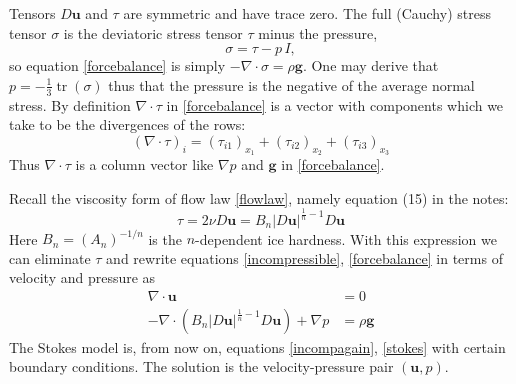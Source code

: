 \documentclass[letterpaper,final,12pt,reqno]{amsart}
\newcommand{\Div}{\nabla\cdot}
\newcommand{\trace}{\operatorname{tr}}
\newcommand{\bg}{\mathbf{g}}
\newcommand{\bu}{\mathbf{u}}
\begin{document}
Tensors $D\bu$ and $\tau$ are symmetric and have trace zero.  The full (Cauchy) stress tensor $\sigma$ is the deviatoric stress tensor $\tau$ minus the pressure,
\begin{equation}
    \sigma = \tau - p\,I,  \label{cauchystress}
\end{equation}
so equation \eqref{forcebalance} is simply $-\Div \sigma = \rho \bg$.  One may derive that $p = -\frac{1}{3} \trace(\sigma)$ thus that the pressure is the negative of the average normal stress.  By definition $\Div\tau$ in \eqref{forcebalance} is a vector with components which we take to be the divergences of the rows:
    $$\left(\nabla \cdot \tau\right)_i = \left(\tau_{i1}\right)_{x_1} + \left(\tau_{i2}\right)_{x_2} + \left(\tau_{i3}\right)_{x_3}$$
Thus $\nabla\cdot \tau$ is a column vector like $\nabla p$ and $\bg$ in \eqref{forcebalance}.

Recall the viscosity form of flow law \eqref{flowlaw}, namely equation (15) in the notes:
\begin{equation}
\tau = 2\nu D\bu = B_n |D\bu|^{\frac{1}{n} - 1} D\bu  \label{viscflowlaw}
\end{equation}
Here $B_n = (A_n)^{-1/n}$ is the $n$-dependent ice hardness.  With this expression we can eliminate $\tau$ and rewrite equations \eqref{incompressible}, \eqref{forcebalance} in terms of velocity and pressure as
\begin{align}
\Div \bu &= 0 \label{incompagain} \\
- \nabla \cdot \left(B_n |D\bu|^{\frac{1}{n} - 1} D\bu\right) + \nabla p &= \rho \mathbf{g} \label{stokes}
\end{align}
The Stokes model is, from now on, equations \eqref{incompagain}, \eqref{stokes} with certain boundary conditions.  The solution is the velocity-pressure pair $(\bu,p)$.
\end{document}
